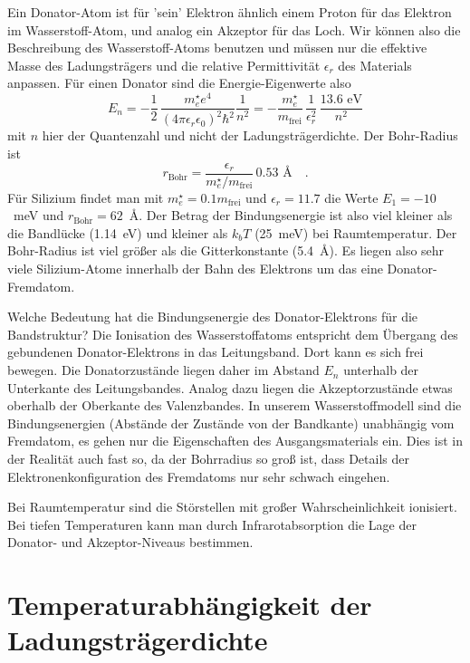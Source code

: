 Ein Donator-Atom ist für 'sein' Elektron ähnlich einem Proton für das Elektron im Wasserstoff-Atom, und analog ein Akzeptor für das Loch. Wir können also die Beschreibung des Wasserstoff-Atoms benutzen und müssen nur die effektive Masse des Ladungsträgers und die relative Permittivität $\epsilon_r$ des Materials anpassen. Für einen Donator sind die Energie-Eigenwerte also 
\begin{equation}
    E_n = - \frac{1}{2} \, \frac{m_e^\star e^4}{(4 \pi \epsilon_r \epsilon_0)^2 \hbar^2}
\frac{1}{n^2} =     
   - \frac{m_e^\star}{m_\text{frei}} \, \frac{1}{\epsilon_r^2} \, \frac{13.6 \text{ eV}}{n^2}
\end{equation}
mit $n$ hier der Quantenzahl und nicht der Ladungsträgerdichte. Der Bohr-Radius ist
\begin{equation}
    r_\text{Bohr} = \frac{\epsilon_r}{m_e^\star / m_\text{frei}} \, 0.53 \text{ \AA} \quad .
\end{equation}
Für Silizium findet man mit $m_e^\star = 0.1 m_\text{frei}$ und $\epsilon_r = 11.7$ die Werte $E_1 = -10$~meV und $ r_\text{Bohr} = 62$~\AA. Der Betrag der Bindungsenergie ist also viel kleiner als die Bandlücke (1.14~eV) und kleiner als $k_b T$ (25~meV) bei Raumtemperatur. Der Bohr-Radius ist viel größer als die Gitterkonstante (5.4~\AA). Es liegen also sehr viele Silizium-Atome innerhalb der Bahn des Elektrons um das eine Donator-Fremdatom.

Welche Bedeutung hat die Bindungsenergie des Donator-Elektrons für die Bandstruktur? Die Ionisation des Wasserstoffatoms entspricht dem Übergang des gebundenen Donator-Elektrons in das Leitungsband. Dort kann es sich frei bewegen. Die Donatorzustände liegen daher im Abstand $E_n$ unterhalb der Unterkante des Leitungsbandes. Analog dazu liegen die Akzeptorzustände etwas oberhalb der Oberkante des Valenzbandes. In unserem Wasserstoffmodell sind die Bindungsenergien (Abstände der Zustände von der Bandkante) unabhängig vom Fremdatom, es gehen nur die Eigenschaften des Ausgangsmaterials ein. Dies ist in der Realität auch fast so, da der Bohrradius so groß ist, dass Details der Elektronenkonfiguration des Fremdatoms nur sehr schwach eingehen.

Bei Raumtemperatur sind die Störstellen mit großer Wahrscheinlichkeit ionisiert. Bei tiefen Temperaturen kann man durch Infrarotabsorption die Lage der Donator- und Akzeptor-Niveaus bestimmen.

\section{Temperaturabhängigkeit der Ladungsträgerdichte}

